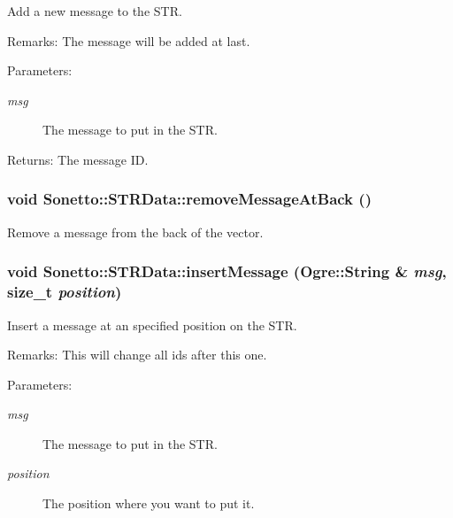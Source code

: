 Add a new message to the STR. \begin{Desc}
\item[Remarks:]The message will be added at last. \end{Desc}
\begin{Desc}
\item[Parameters:]
\begin{description}
\item[{\em msg}]The message to put in the STR. \end{description}
\end{Desc}
\begin{Desc}
\item[Returns:]The message ID. \end{Desc}
\subsubsection{\setlength{\rightskip}{0pt plus 5cm}void Sonetto::STRData::removeMessageAtBack ()}\label{class_sonetto_1_1_s_t_r_data_99b3c5f4b515840f755d8b194fe4f30f}


Remove a message from the back of the vector. 

\subsubsection{\setlength{\rightskip}{0pt plus 5cm}void Sonetto::STRData::insertMessage (Ogre::String \& {\em msg}, size\_\-t {\em position})}\label{class_sonetto_1_1_s_t_r_data_1aa3c4ed87091a6f55f7d3cb45830289}


Insert a message at an specified position on the STR. \begin{Desc}
\item[Remarks:]This will change all ids after this one. \end{Desc}
\begin{Desc}
\item[Parameters:]
\begin{description}
\item[{\em msg}]The message to put in the STR. \item[{\em position}]The position where you want to put it. \end{description}
\end{Desc}
